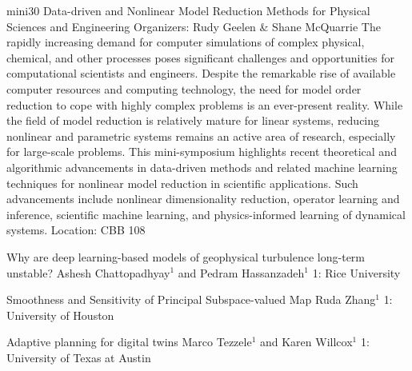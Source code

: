 \mini
{mini30}
{Data-driven and Nonlinear Model Reduction Methods for Physical Sciences and Engineering}
{Organizers: Rudy Geelen \& Shane McQuarrie}
{The rapidly increasing demand for computer simulations of complex physical, chemical, and other processes poses significant challenges and opportunities for computational scientists and engineers. Despite the remarkable rise of available computer resources and computing technology, the need for model order reduction to cope with highly complex problems is an ever-present reality. While the field of model reduction is relatively mature for linear systems, reducing nonlinear and parametric systems remains an active area of research, especially for large-scale problems. This mini-symposium highlights recent theoretical and algorithmic advancements in data-driven methods and related machine learning techniques for nonlinear model reduction in scientific applications. Such advancements include nonlinear dimensionality reduction, operator learning and inference, scientific machine learning, and physics-informed learning of dynamical systems.}
{Location: CBB 108}

\begin{talks}
\item\talk
{Why are deep learning-based models of geophysical turbulence long-term unstable?}
{Ashesh Chattopadhyay$^1$ and Pedram Hassanzadeh$^1$}
{1: Rice University}
\item\talk
{Smoothness and Sensitivity of Principal Subspace-valued Map}
{Ruda Zhang$^{1}$}
{1: University of Houston}
\item\talk
{Adaptive planning for digital twins}
{Marco Tezzele$^{1}$ and Karen Willcox$^{1}$}
{1: University of Texas at Austin}
\end{talks}
\room

